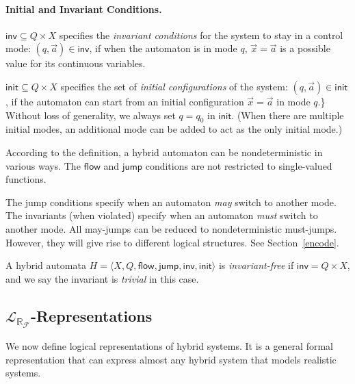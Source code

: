 \documentclass[envcountsect]{llncs}
\newcommand{\flow}{\mathsf{flow}}
\newcommand{\jump}{\mathsf{jump}}
\newcommand{\inv}{\mathsf{inv}}
\newcommand{\init}{\mathsf{init}}
\newcommand{\lrf}{\mathcal{L}_{\mathbb{R}_{\mathcal{F}}}}
\begin{document}
\begin{definition}
\paragraph{\bf Initial and Invariant Conditions.} $\inv \subseteq Q\times X$
specifies the {\em invariant conditions} for
the system to stay in a control mode: $(q,\vec a)\in \inv$, if when the
automaton is in mode $q$, $\vec x = \vec a$ is a possible value for its
continuous variables.

$\init \subseteq Q\times X$ specifies the set of {\em
initial configurations} of the system: $(q, \vec a)\in \init$, if the
automaton can start from an initial configuration $\vec x = \vec a$ in mode
$q$.\} Without loss of generality, we always set $q=q_0$ in $\init$. (When there
are multiple initial modes, an additional mode can be
added to act as the only initial mode.)
\end{definition}
According to the definition, a hybrid automaton can be nondeterministic in
various ways.  The $\flow$ and $\jump$ conditions are not
restricted to single-valued functions.
\begin{remark}[$\jump$ vs $\inv$] The jump conditions specify when an automaton
{\em may}  switch to another mode. The invariants (when violated) specify when
an automaton {\em must} switch to another mode. All may-jumps can
be reduced to nondeterministic must-jumps. However, they will give rise to
different logical structures. See Section~\ref{encode}. 
\end{remark}
\begin{definition}
A hybrid automata $H = \langle X, Q, \flow, \jump, \inv, \init\rangle$ is
 {\em invariant-free} if $\inv = Q\times X$, and we say the invariant is {\em
trivial} in this case.
\end{definition}

\subsection{$\lrf$-Representations}

We now define logical representations of hybrid systems. It is a general
formal representation that can express almost any hybrid system that models
realistic systems. 
\end{document}
